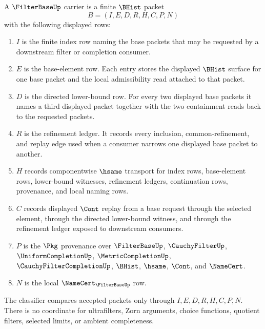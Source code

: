 \begin{definition}
\label{def:filter-base-carrier}
A $\FilterBaseUp$ carrier is a finite $\BHist$ packet
$$
B=(I,E,D,R,H,C,P,N)
$$
with the following displayed rows:
\begin{enumerate}
\item $I$ is the finite index row naming the base packets that may be requested by a downstream filter or completion consumer.
\item $E$ is the base-element row. Each entry stores the displayed $\BHist$ surface for one base packet and the local admissibility read attached to that packet.
\item $D$ is the directed lower-bound row. For every two displayed base packets it names a third displayed packet together with the two containment reads back to the requested packets.
\item $R$ is the refinement ledger. It records every inclusion, common-refinement, and replay edge used when a consumer narrows one displayed base packet to another.
\item $H$ records componentwise $\hsame$ transport for index rows, base-element rows, lower-bound witnesses, refinement ledgers, continuation rows, provenance, and local naming rows.
\item $C$ records displayed $\Cont$ replay from a base request through the selected element, through the directed lower-bound witness, and through the refinement ledger exposed to downstream consumers.
\item $P$ is the $\Pkg$ provenance over $\FilterBaseUp$, $\CauchyFilterUp$, $\UniformCompletionUp$, $\MetricCompletionUp$, $\CauchyFilterCompletionUp$, $\BHist$, $\hsame$, $\Cont$, and $\NameCert$.
\item $N$ is the local $\NameCert_{\FilterBaseUp}$ row.
\end{enumerate}
The classifier compares accepted packets only through $I,E,D,R,H,C,P,N$. There is no coordinate for ultrafilters, Zorn arguments, choice functions, quotient filters, selected limits, or ambient completeness.
\end{definition}

